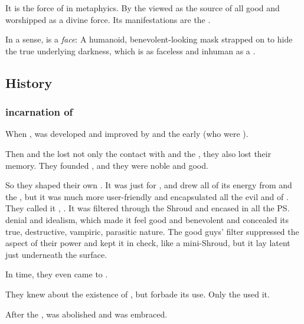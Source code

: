 It is the force of  in  metaphyics. By the  viewed as the source of all good and worshipped as a divine force. Its manifestations are the . 

In a sense, \iquin{} is a \emph{face}: 
A humanoid, benevolent-looking mask strapped on to hide the true underlying darkness, which is as faceless and inhuman as a \bane. 








\subsection{History}
\subsubsection{\Merkyran{} incarnation of \iquin}
When , \nieur{} was developed and improved by  and the early \resphain{} (who were ). 

Then  and the \resphain{} lost not only the contact with \Semiza{} and the \banelords, they also lost their memory. 
They founded , and they were noble and good. 

So they shaped their own \dweomer. 
It was just  for \nieur, and drew all of its energy from \Nyx{} and the \banelords, but it was much more user-friendly and encapsulated all the evil and  of \nieur. They called it \iquin, . 
It was filtered through the Shroud and encased in all the \ps{\resphain}{} denial and idealism, which made it feel good and benevolent and concealed its true, destructive, vampiric, parasitic nature. 
The good guys' filter suppressed the \Nyxian{} aspect of their power and kept it in check, like a mini-Shroud, but it lay latent just underneath the surface. 

In time, they even came to . 

They knew about the existence of \nieur, but forbade its use. Only the  used it. 

After the , \iquin{} was abolished and \nieur{} was embraced.





